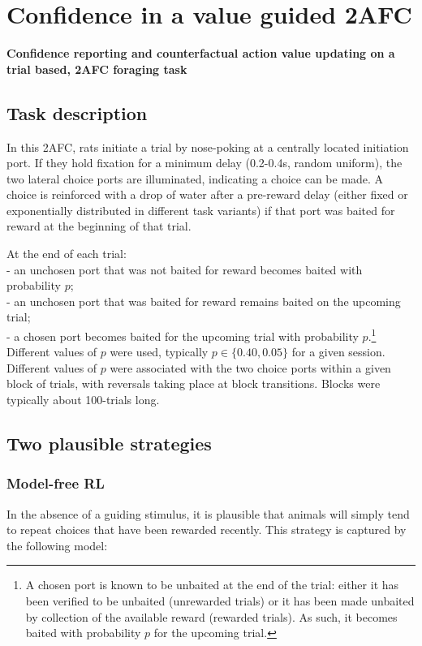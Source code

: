 \section{Confidence in a value guided 2AFC}
\label{task:lauglim}

\textbf{Confidence reporting and counterfactual action value updating on a trial based, 2AFC foraging task}

\subsection{Task description}
In this 2AFC, rats initiate a trial by nose-poking at a centrally located initiation port.
If they hold fixation for a minimum delay (0.2-0.4s, random uniform), the two lateral choice ports are illuminated, indicating a choice can be made.
A choice is reinforced with a drop of water after a pre-reward delay (either fixed or exponentially distributed in different task variants) if that port was baited for reward at the beginning of that trial.

At the end of each trial: \\
- an unchosen port that was not baited for reward becomes baited with probability $p$; \\
- an unchosen port that was baited for reward remains baited on the upcoming trial; \\
- a chosen port becomes baited for the upcoming trial with probability $p$.\footnote{A chosen port is known to be unbaited at the end of the trial: either it has been verified to be unbaited (unrewarded trials) or it has been made unbaited by collection of the available reward (rewarded trials). As such, it becomes baited with probability $p$ for the upcoming trial.}\\

Different values of $p$ were used, typically $p \in \{0.40, 0.05\}$ for a given session.
Different values of $p$ were associated with the two choice ports within a given block of trials, with reversals taking place at block transitions.
Blocks were typically about 100-trials long.

\subsection{Two plausible strategies}
\subsubsection{Model-free RL}
In the absence of a guiding stimulus, it is plausible that animals will simply tend to repeat choices that have been rewarded recently.
This strategy is captured by the following model:

